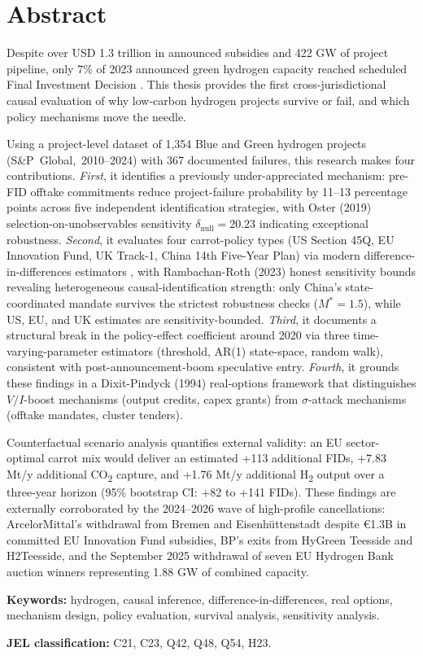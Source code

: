 \chapter*{Abstract}

Despite over USD 1.3 trillion in announced subsidies and 422 GW of project pipeline, only 7\% of 2023 announced green hydrogen capacity reached scheduled Final Investment Decision \cite{odenweller2025green}. This thesis provides the first cross-jurisdictional causal evaluation of why low-carbon hydrogen projects survive or fail, and which policy mechanisms move the needle.

Using a project-level dataset of 1,354 Blue and Green hydrogen projects \mbox{(S\&P Global, 2010--2024)} with 367 documented failures, this research makes four contributions. \emph{First}, it identifies a previously under-appreciated mechanism: pre-FID offtake commitments reduce project-failure probability by 11--13 percentage points across five independent identification strategies, with Oster (2019) selection-on-unobservables sensitivity $\delta_{\text{null}} = 20.23$ indicating exceptional robustness. \emph{Second}, it evaluates four carrot-policy types (US Section 45Q, EU Innovation Fund, UK Track-1, China 14th Five-Year Plan) via modern difference-in-differences estimators \cite{sun2021estimating,borusyak2024revisiting}, with Rambachan-Roth (2023) honest sensitivity bounds revealing heterogeneous causal-identification strength: only China's state-coordinated mandate survives the strictest robustness checks ($M^* = 1.5$), while US, EU, and UK estimates are sensitivity-bounded. \emph{Third}, it documents a structural break in the policy-effect coefficient around 2020 via three time-varying-parameter estimators (threshold, AR(1) state-space, random walk), consistent with post-announcement-boom speculative entry. \emph{Fourth}, it grounds these findings in a Dixit-Pindyck (1994) real-options framework that distinguishes $V/I$-boost mechanisms (output credits, capex grants) from $\sigma$-attack mechanisms (offtake mandates, cluster tenders).

Counterfactual scenario analysis quantifies external validity: an EU sector-optimal carrot mix would deliver an estimated +113 additional FIDs, +7.83 Mt/y additional CO\textsubscript{2} capture, and +1.76 Mt/y additional H\textsubscript{2} output over a three-year horizon (95\% bootstrap CI: +82 to +141 FIDs). These findings are externally corroborated by the 2024--2026 wave of high-profile cancellations: ArcelorMittal's withdrawal from Bremen and Eisenhüttenstadt despite \euro 1.3B in committed EU Innovation Fund subsidies, BP's exits from HyGreen Teesside and H2Teesside, and the September 2025 withdrawal of seven EU Hydrogen Bank auction winners representing 1.88 GW of combined capacity.

\bigskip
\noindent\textbf{Keywords:} hydrogen, causal inference, difference-in-differences, real options, mechanism design, policy evaluation, survival analysis, sensitivity analysis.

\noindent\textbf{JEL classification:} C21, C23, Q42, Q48, Q54, H23.

\clearpage
